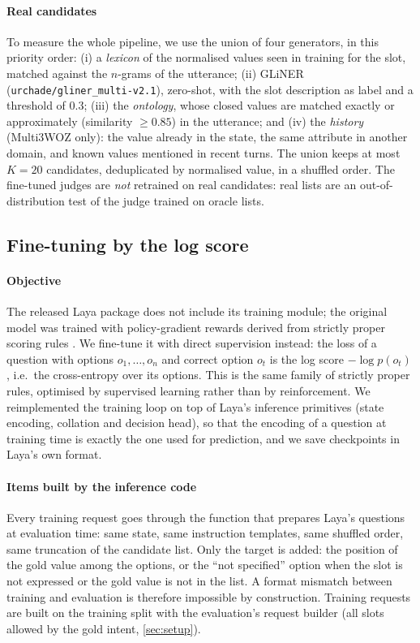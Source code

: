 \paragraph{Real candidates} To measure the whole pipeline, we use the union of four generators, in this priority order: (i) a \emph{lexicon} of the normalised values seen in training for the slot, matched against the $n$-grams of the utterance; (ii) GLiNER \citep{zaratiana2024gliner} (\texttt{urchade/gliner\_multi-v2.1}), zero-shot, with the slot description as label and a threshold of 0.3; (iii) the \emph{ontology}, whose closed values are matched exactly or approximately (similarity $\ge 0.85$) in the utterance; and (iv) the \emph{history} (Multi3WOZ only): the value already in the state, the same attribute in another domain, and known values mentioned in recent turns. The union keeps at most $K=20$ candidates, deduplicated by normalised value, in a shuffled order. The fine-tuned judges are \emph{not} retrained on real candidates: real lists are an out-of-distribution test of the judge trained on oracle lists.

\subsection{Fine-tuning by the log score}
\label{sec:finetuning}

\paragraph{Objective} The released Laya package does not include its training module; the original model was trained with policy-gradient rewards derived from strictly proper scoring rules \citep{laya2026}. We fine-tune it with direct supervision instead: the loss of a question with options $o_1,\dots,o_n$ and correct option $o_{t}$ is the log score $-\log p(o_{t})$ \citep{gneiting2007scoring}, i.e.\ the cross-entropy over its options. This is the same family of strictly proper rules, optimised by supervised learning rather than by reinforcement. We reimplemented the training loop on top of Laya's inference primitives (state encoding, collation and decision head), so that the encoding of a question at training time is exactly the one used for prediction, and we save checkpoints in Laya's own format.

\paragraph{Items built by the inference code} Every training request goes through the function that prepares Laya's questions at evaluation time: same state, same instruction templates, same shuffled order, same truncation of the candidate list. Only the target is added: the position of the gold value among the options, or the ``not specified'' option when the slot is not expressed or the gold value is not in the list. A format mismatch between training and evaluation is therefore impossible by construction. Training requests are built on the training split with the evaluation's request builder (all slots allowed by the gold intent, \cref{sec:setup}).

